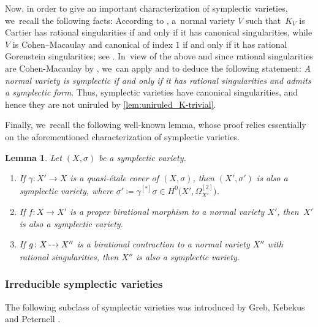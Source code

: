 \documentclass[JEP,XML,SOM,Unicode,published]{cedram}
\newcommand{\dradpl}{{\hspace*{-2.5mm}\begin{tikzcd}[ampersand replacement=\&,column sep = scriptsize]\mbox{}\ar[r,dashed]\&\mbox{}\end{tikzcd}\hspace*{-2.5mm}}}
\newcommand{\dratst}{{\hspace*{-2.5mm}\begin{tikzcd}[ampersand replacement=\&,column sep = small]\mbox{}\ar[r,dashed]\&\mbox{}\end{tikzcd}\hspace*{-2mm}}}
\let\drascst\dratst
\newcommand{\dra}{\mathchoice{\dradpl}{\dratst}{\drascst}{\drascst}}
\theoremstyle{plain}
\newtheorem{lem}[thm]{Lemma}
\theoremstyle{definition}
\begin{document}
Now, in order to give an important characterization of symplectic varieties, we~recall the following facts: According to \cite[Cor.\,5.24]{KM98}, a~normal variety $V$ such that~$K_V$ is Cartier has rational singularities if and only if it has canonical singularities, while $V$ is Cohen--Macaulay and canonical of index $1$ if and only if it has rational Gorenstein singularities; see \cite[p.\,286]{Reid80}. In~view of the above and since rational singularities are Cohen-Macaulay by \cite[Th.\,5.10]{KM98}, we~can apply \cite[Prop.\,1.3]{Beauville00a} and \cite[Th.\,4]{Nam01b} to deduce the following statement: \emph{A normal variety is symplectic if and only if it has rational singularities and admits a symplectic form}.
Thus, symplectic varieties have canonical singularities, and hence they are not uniruled by \autoref{lem:uniruled_K-trivial}.\enlargethispage{-\baselineskip}

Finally, we~recall the following well-known lemma, whose proof relies essentially on the aforementioned characterization of symplectic varieties.

\pagebreak[2]
\begin{lem}
\label{lem:symplectic_under_maps}
Let $(X, \sigma)$ be a symplectic variety.
\begin{enumerate}
\item\label{lem:symplectic_under_mapsi}
If $\gamma \colon X'\to X$ is a quasi-étale cover of $(X, \sigma)$, then $(X', \sigma')$ is also a symplectic variety, where $\sigma' \coloneqq \gamma^{[*]} \sigma \in H^0 \bigl(X',\Omega_{X'}^{[2]} \bigr)$.

\item\label{lem:symplectic_under_mapsii}
If $f \colon X \to X'$ is a proper birational morphism to a normal variety $X'$, then~$X'$ is also a symplectic variety.

\item\label{lem:symplectic_under_mapsiii}
If $g \colon X \dra X''$ is a birational contraction to a normal variety $X''$ with rational singularities, then $X''$ is also a symplectic variety.
\end{enumerate}
\end{lem}

\subsubsection{Irreducible symplectic varieties}

The following subclass of symplectic varieties was introduced by Greb, Kebekus and Peternell \cite{GKP16b}.
\end{document}

